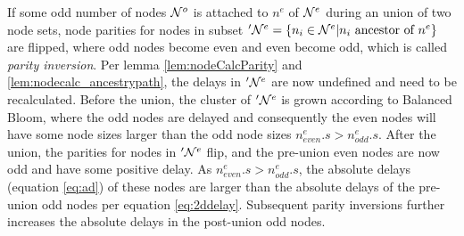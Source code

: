 If some odd number of nodes $\mathcal{N}^o$ is attached to $n^e$ of $\mathcal{N}^e$ during an union of two node sets, node parities for nodes in subset $'\mathcal{N}^e= \{n_i \in \mathcal{N}^e | n_i \mbox{ ancestor of } n^e\}$ are flipped, where odd nodes become even and even become odd, which is called \emph{parity inversion}. Per lemma \ref{lem:nodeCalcParity} and \ref{lem:nodecalc_ancestrypath}, the delays in $'\mathcal{N}^e$ are now undefined and need to be recalculated. Before the union, the cluster of $'\mathcal{N}^e$ is grown according to Balanced Bloom, where the odd nodes are delayed and consequently the even nodes will have some node sizes larger than the odd node sizes $n^e_{even}.s > n^e_{odd}.s$.
After the union, the parities for nodes in $'\mathcal{N}^e$ flip, and the pre-union even nodes are now odd and have some positive delay. As $n^e_{even}.s > n^e_{odd}.s$, the absolute delays (equation \ref{eq:ad}) of these nodes are larger than the absolute delays of the pre-union odd nodes per equation \ref{eq:2ddelay}. Subsequent parity inversions further increases the absolute delays in the post-union odd nodes.

